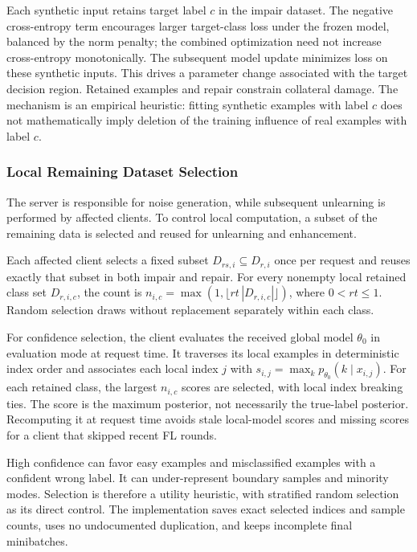 \documentclass[software,article,submit,moreauthors]{Definitions/mdpi}
\begin{document}
Each synthetic input retains target label $c$ in the impair dataset. The
negative cross-entropy term encourages larger target-class loss under the frozen
model, balanced by the norm penalty; the combined optimization need not increase
cross-entropy monotonically. The subsequent model update minimizes loss on
these synthetic inputs. This drives a parameter
change associated with the target decision region. Retained examples and repair
constrain collateral damage. The mechanism is an empirical heuristic: fitting
synthetic examples with label $c$ does not mathematically imply deletion of the
training influence of real examples with label $c$.

\subsubsection{Local Remaining Dataset Selection}
\label{sec:selection}
The server is responsible for noise generation, while subsequent unlearning is
performed by affected clients. To control local computation, a subset of the
remaining data is selected and reused for unlearning and enhancement.

Each affected client selects a fixed subset $D_{rs,i}\subseteq D_{r,i}$ once per
request and reuses exactly that subset in both impair and repair. For every
nonempty local retained class set $D_{r,i,c}$, the count is
$n_{i,c}=\max(1,\lfloor rt\,|D_{r,i,c}|\rfloor)$, where $0<rt\leq1$.
Random selection draws without replacement separately within each class.

For confidence selection, the client evaluates the received global model
$\theta_0$ in evaluation mode at request time. It traverses its local examples
in deterministic index order and associates each local index $j$ with
$s_{i,j}=\max_k p_{\theta_0}(k\mid x_{i,j})$. For each retained class, the
largest $n_{i,c}$ scores are selected, with local index breaking ties. The score
is the maximum posterior, not necessarily the true-label posterior. Recomputing
it at request time avoids stale local-model scores and missing scores for a
client that skipped recent FL rounds.

High confidence can favor easy examples and misclassified examples with a
confident wrong label. It can under-represent boundary samples and minority
modes. Selection is therefore a utility heuristic, with stratified random
selection as its direct control. The implementation saves exact selected indices
and sample counts, uses no undocumented duplication, and keeps incomplete final
minibatches.
\end{document}
